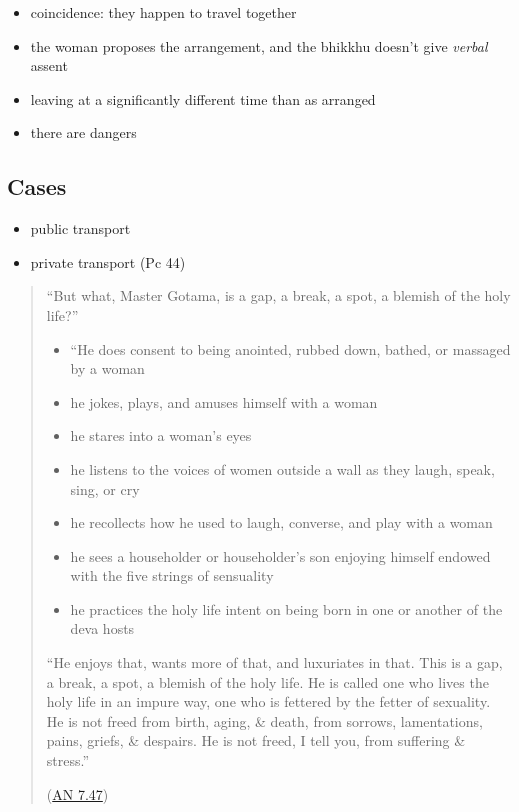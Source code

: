 \begin{itemize}
\tightlist
\item
  coincidence: they happen to travel together
\item
  the woman proposes the arrangement, and the bhikkhu doesn't give
  \emph{verbal} assent
\item
  leaving at a significantly different time than as arranged
\item
  there are dangers
\end{itemize}

\subsection{Cases}

\begin{itemize}
\tightlist
\item
  public transport
\item
  private transport (Pc 44)
\end{itemize}

\clearpage

\begin{quote}
``But what, Master Gotama, is a gap, a break, a spot, a blemish of the
holy life?''

\begin{itemize}
\tightlist
\item
  ``He does consent to being anointed, rubbed down, bathed, or massaged
  by a woman
\item
  he jokes, plays, and amuses himself with a woman
\item
  he stares into a woman's eyes
\item
  he listens to the voices of women outside a wall as they laugh, speak,
  sing, or cry
\item
  he recollects how he used to laugh, converse, and play with a woman
\item
  he sees a householder or householder's son enjoying himself endowed
  with the five strings of sensuality
\item
  he practices the holy life intent on being born in one or another of
  the deva hosts
\end{itemize}

``He enjoys that, wants more of that, and luxuriates in that. This is a
gap, a break, a spot, a blemish of the holy life. He is called one who
lives the holy life in an impure way, one who is fettered by the fetter
of sexuality. He is not freed from birth, aging, \& death, from sorrows,
lamentations, pains, griefs, \& despairs. He is not freed, I tell you,
from suffering \& stress.''

(\href{https://www.dhammatalks.org/suttas/AN/AN7_47.html}{AN 7.47})
\end{quote}

